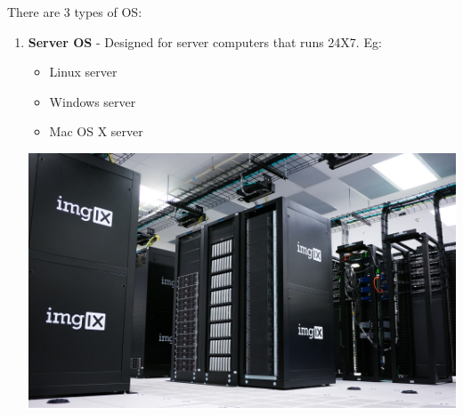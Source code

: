 \setlength{\columnsep}{20pt}
\begin{flushleft}
	There are 3 types of OS:
	\begin{enumerate}
		\item 
		\begin{multicols}{2}
			\textbf{Server OS} - Designed for server computers that runs 24X7.
			\newline
			Eg:
			\begin{itemize}
				\item Linux server
				\item Windows server
				\item Mac OS X server
			\end{itemize}
			\vfill \null
			\columnbreak
			\includegraphics[scale=.03]{content/chapter1/images/server.jpg}
		\end{multicols}
		\vspace{-25pt}

\bigskip
		

\end{enumerate}
\end{flushleft}
